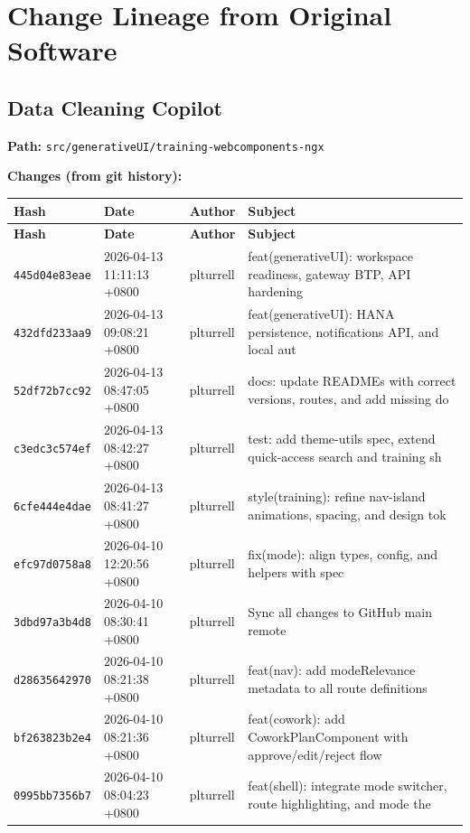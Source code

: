\documentclass[11pt,a4paper]{article}
\begin{document}
\newpage
\section{Change Lineage from Original Software}

\subsection{Data Cleaning Copilot}
\textbf{Path:} \texttt{src/generativeUI/training-webcomponents-ngx}

\textbf{Changes (from git history):}
\begin{longtable}{|p{2.2cm}|p{3.2cm}|l|p{6cm}|}
\hline \textbf{Hash} & \textbf{Date} & \textbf{Author} & \textbf{Subject} \\ \hline \endfirsthead
\hline \textbf{Hash} & \textbf{Date} & \textbf{Author} & \textbf{Subject} \\ \hline \endhead
\texttt{445d04e83eae} & 2026-04-13 11:11:13 +0800 & plturrell & feat(generativeUI): workspace readiness, gateway BTP, API hardening \\
\texttt{432dfd233aa9} & 2026-04-13 09:08:21 +0800 & plturrell & feat(generativeUI): HANA persistence, notifications API, and local aut \\
\texttt{52df72b7cc92} & 2026-04-13 08:47:05 +0800 & plturrell & docs: update READMEs with correct versions, routes, and add missing do \\
\texttt{c3edc3c574ef} & 2026-04-13 08:42:27 +0800 & plturrell & test: add theme-utils spec, extend quick-access search and training sh \\
\texttt{6cfe444e4dae} & 2026-04-13 08:41:27 +0800 & plturrell & style(training): refine nav-island animations, spacing, and design tok \\
\texttt{efc97d0758a8} & 2026-04-10 12:20:56 +0800 & plturrell & fix(mode): align types, config, and helpers with spec \\
\texttt{3dbd97a3b4d8} & 2026-04-10 08:30:41 +0800 & plturrell & Sync all changes to GitHub main remote \\
\texttt{d28635642970} & 2026-04-10 08:21:38 +0800 & plturrell & feat(nav): add modeRelevance metadata to all route definitions \\
\texttt{bf263823b2e4} & 2026-04-10 08:21:36 +0800 & plturrell & feat(cowork): add CoworkPlanComponent with approve/edit/reject flow \\
\texttt{0995bb7356b7} & 2026-04-10 08:04:23 +0800 & plturrell & feat(shell): integrate mode switcher, route highlighting, and mode the \\

\end{longtable}
\end{document}
